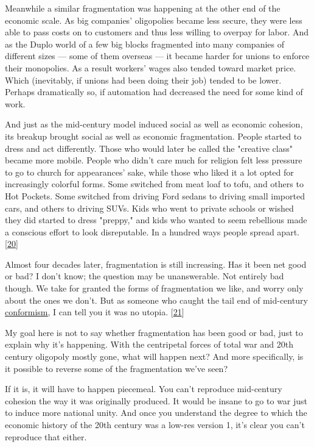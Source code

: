 Meanwhile a similar fragmentation was happening at the other end
of the economic scale.  As big companies' oligopolies became less
secure, they were less able to pass costs on to customers and thus
less willing to overpay for labor.  And as the Duplo world of a few
big blocks fragmented into many companies of different sizes --- some
of them overseas --- it became harder for unions to enforce their
monopolies.  As a result workers' wages also tended toward market
price. Which (inevitably, if unions had been doing their job) tended
to be lower.  Perhaps dramatically so, if automation had decreased
the need for some kind of work.

And just as the mid-century model induced social as well as economic
cohesion, its breakup brought social as well as economic fragmentation.
People started to dress and act differently.  Those who would later
be called the "creative class" became more mobile. People who didn't
care much for religion felt less pressure to go to church for
appearances' sake, while those who liked it a lot opted for
increasingly colorful forms. Some switched from meat loaf to tofu,
and others to Hot Pockets. Some switched from driving Ford sedans
to driving small imported cars, and others to driving SUVs.  Kids
who went to private schools or wished they did started to dress
"preppy," and kids who wanted to seem rebellious made a conscious
effort to look disreputable.  In a hundred ways people spread apart.
[\href{\#f20n}{20}]

Almost four decades later, fragmentation is still increasing.  Has
it been net good or bad?  I don't know; the question may be
unanswerable.  Not entirely bad though.  We take for granted the
forms of fragmentation we like, and worry only about the ones we
don't. But as someone who caught the tail end of mid-century
\href{https://books.google.com/ngrams/graph?content=well-adjusted\&year\_start=1800\&year\_end=2000\&corpus=15\&smoothing=3}{\underline{conformism}}, 
I can tell you it was no utopia.
[\href{\#f21n}{21}]

My goal here is not to say whether fragmentation has been good or
bad, just to explain why it's happening.  With the centripetal
forces of total war and 20th century oligopoly mostly gone, what
will happen next?  And more specifically, is it possible to reverse
some of the fragmentation we've seen?

If it is, it will have to happen piecemeal.  You can't reproduce
mid-century cohesion the way it was originally produced.  It would
be insane to go to war just to induce more national unity.  And
once you understand the degree to which the economic history of the
20th century was a low-res version 1, it's clear you can't reproduce
that either.

